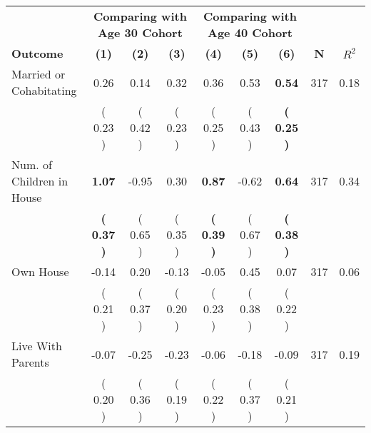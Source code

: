 \begin{tabular}{lcccccccc}
\toprule
 & \multicolumn{3}{c}{\textbf{Comparing with Age 30 Cohort}} & \multicolumn{3}{c}{\textbf{Comparing with Age 40 Cohort}} & \\
\cmidrule(lr){2-4} \cmidrule(lr){5-7} 
 \textbf{Outcome} & \textbf{(1)} & \textbf{(2)} & \textbf{(3)} & \textbf{(4)} & \textbf{(5)} & \textbf{(6)} & \textbf{N} & \textbf{$ R^2$} \\
\midrule
Married or Cohabitating &      0.26 &      0.14 &      0.32 &      0.36 &      0.53 & \textbf{     0.54} & 317 &       0.18 \\ 
 & (     0.23 ) & (     0.42 ) & (     0.23 ) & (     0.25 ) & (     0.43 ) & \textbf{(     0.25 )} & \\
Num. of Children in House & \textbf{     1.07} &     -0.95 &      0.30 & \textbf{     0.87} &     -0.62 & \textbf{     0.64} & 317 &       0.34 \\ 
 & \textbf{(     0.37 )} & (     0.65 ) & (     0.35 ) & \textbf{(     0.39 )} & (     0.67 ) & \textbf{(     0.38 )} & \\
Own House &     -0.14 &      0.20 &     -0.13 &     -0.05 &      0.45 &      0.07 & 317 &       0.06 \\ 
 & (     0.21 ) & (     0.37 ) & (     0.20 ) & (     0.23 ) & (     0.38 ) & (     0.22 ) & \\
Live With Parents &     -0.07 &     -0.25 &     -0.23 &     -0.06 &     -0.18 &     -0.09 & 317 &       0.19 \\ 
 & (     0.20 ) & (     0.36 ) & (     0.19 ) & (     0.22 ) & (     0.37 ) & (     0.21 ) & \\
\bottomrule
\end{tabular}
